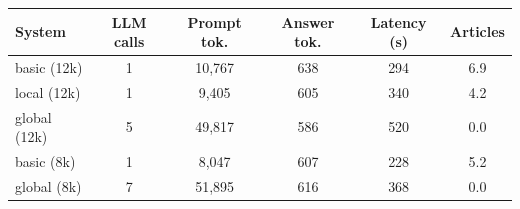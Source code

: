 \begin{tabular}{lccccc}
\toprule
System & LLM calls & Prompt tok. & Answer tok. & Latency (s) & Articles \\
\midrule
basic (12k) & 1 & 10,767 & 638 & 294 & 6.9 \\
local (12k) & 1 & 9,405 & 605 & 340 & 4.2 \\
global (12k) & 5 & 49,817 & 586 & 520 & 0.0 \\
basic (8k) & 1 & 8,047 & 607 & 228 & 5.2 \\
global (8k) & 7 & 51,895 & 616 & 368 & 0.0 \\
\bottomrule
\end{tabular}
